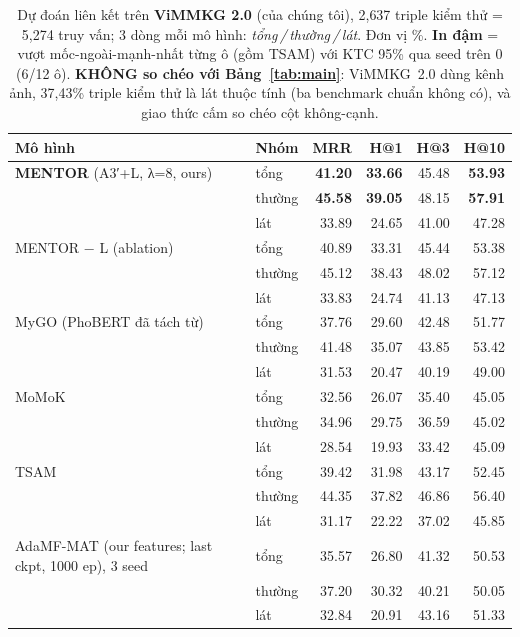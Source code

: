 \begin{table}[t]
\centering
\footnotesize
\setlength{\tabcolsep}{4.5pt}
\caption{Dự đoán liên kết trên \textbf{ViMMKG 2.0} (của chúng tôi), 2{,}637 triple kiểm thử = 5{,}274 truy vấn; 3 dòng mỗi mô hình: \emph{tổng\,/\,thường\,/\,lát}. Đơn vị \%. \textbf{In đậm} = vượt mốc-ngoài-mạnh-nhất từng ô (gồm TSAM) với KTC 95\% qua seed trên 0 (6/12 ô). \textbf{KHÔNG so chéo với Bảng~\ref{tab:main}}: ViMMKG~2.0 dùng kênh ảnh, 37{,}43\% triple kiểm thử là lát thuộc tính (ba benchmark chuẩn không có), và giao thức cấm so chéo cột không-cạnh.}
\label{tab:vimmkg2}
\begin{tabular}{l l r r r r}
\toprule
Mô hình & Nhóm & MRR & H@1 & H@3 & H@10 \\
\midrule
\textbf{MENTOR} (A3′+L, λ=8, ours) & tổng & \textbf{41.20} & \textbf{33.66} & 45.48 & \textbf{53.93} \\
 & thường & \textbf{45.58} & \textbf{39.05} & 48.15 & \textbf{57.91} \\
 & lát & 33.89 & 24.65 & 41.00 & 47.28 \\
\midrule
MENTOR − L (ablation) & tổng & 40.89 & 33.31 & 45.44 & 53.38 \\
 & thường & 45.12 & 38.43 & 48.02 & 57.12 \\
 & lát & 33.83 & 24.74 & 41.13 & 47.13 \\
\midrule
MyGO (PhoBERT đã tách từ) & tổng & 37.76 & 29.60 & 42.48 & 51.77 \\
 & thường & 41.48 & 35.07 & 43.85 & 53.42 \\
 & lát & 31.53 & 20.47 & 40.19 & 49.00 \\
\midrule
MoMoK & tổng & 32.56 & 26.07 & 35.40 & 45.05 \\
 & thường & 34.96 & 29.75 & 36.59 & 45.02 \\
 & lát & 28.54 & 19.93 & 33.42 & 45.09 \\
\midrule
TSAM & tổng & 39.42 & 31.98 & 43.17 & 52.45 \\
 & thường & 44.35 & 37.82 & 46.86 & 56.40 \\
 & lát & 31.17 & 22.22 & 37.02 & 45.85 \\
\midrule
AdaMF-MAT (our features; last ckpt, 1000 ep), 3 seed & tổng & 35.57 & 26.80 & 41.32 & 50.53 \\
 & thường & 37.20 & 30.32 & 40.21 & 50.05 \\
 & lát & 32.84 & 20.91 & 43.16 & 51.33 \\

\end{tabular}
\end{table}
